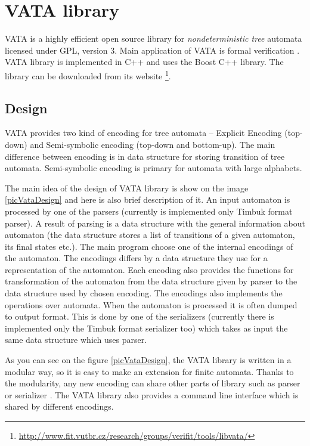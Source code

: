 \section{VATA library}
\label{VATA}
VATA is a highly efficient open source library for \emph{nondeterministic tree} automata licensed under GPL, version 3. 
Main application of VATA is formal verification \cite{libvata}.
VATA library is implemented in C++ and uses the Boost C++ library. The library can be downloaded from its website 
\footnote{\url{http://www.fit.vutbr.cz/research/groups/verifit/tools/libvata/}}.  

\subsection{Design}
\label{sectionDesignVata}
VATA provides two kind of encoding for tree automata -- Explicit Encoding (top-down) and Semi-symbolic encoding (top-down and bottom-up). The main difference
between encoding is
in data structure for storing transition of tree automata. Semi-symbolic encoding is primary for automata with large alphabets. 

The main idea of the design of VATA library is show on the image \ref{picVataDesign} and here is also brief description of it. 
An input automaton is processed by one of the parsers (currently
is implemented only Timbuk format parser). A result of parsing is a data structure with the general information about automaton (the data structure stores a list
of transitions of a given automaton, its final states etc.). The main program choose one of the internal encodings of the automaton. The encodings
differs by a data structure they use for a representation of the automaton. Each encoding also provides the functions for transformation of the automaton 
from the data structure given by parser to the data structure used by chosen encoding. The encodings also implements
the operations over automata. When the automaton is processed it is often dumped to output format. 
This is done by one of the serializers (currently there is implemented only the Timbuk format serializer too) 
which takes as input the same data structure which uses parser.

As you can see on the figure \ref{picVataDesign}, the VATA library is written in a modular way, so it is easy to make an extension for finite automata. 
Thanks to the modularity, any new encoding can share other parts of library such as parser or serializer \cite{libvata}. 
The VATA library also provides a command line interface which is shared by different encodings.

